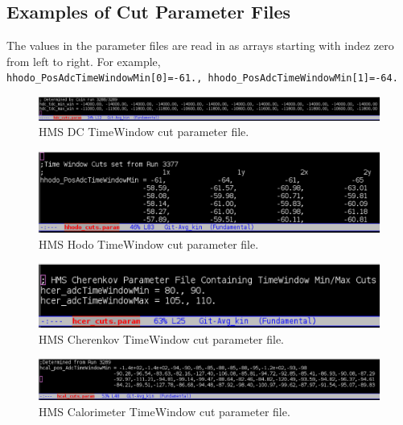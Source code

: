 \documentclass[14pt]{article}
\begin{document}
\newpage 
\begin{appendices}
\appendix
\section{Examples of Cut Parameter Files}
\label{appendix:AppxA}
The values in the parameter files are read in as arrays starting with indez zero from left to right. For example,\\ \texttt{hhodo\_PosAdcTimeWindowMin[0]=-61.,
  hhodo\_PosAdcTimeWindowMin[1]=-64.}
\begin{figure}[H]
  \captionsetup{justification=raggedright,singlelinecheck=false}
  \includegraphics[scale=0.4]{plots/hdc_parm_cut.png}
  \caption{HMS DC TimeWindow cut parameter file.}
  \label{fig:hms_dc_parm_cut}
\end{figure}
\begin{figure}[H]
  \captionsetup{justification=raggedright,singlelinecheck=false}
  \includegraphics[scale=0.4]{plots/hhodo_parm_cut.png}
  \caption{HMS Hodo TimeWindow cut parameter file.}
  \label{fig:hms_hod_parm_cut}
\end{figure}
\begin{figure}[H]
  \captionsetup{justification=raggedright,singlelinecheck=false}
  \includegraphics[scale=0.4]{plots/hcer_parm_cut.png}
  \caption{HMS Cherenkov TimeWindow cut parameter file.}
  \label{fig:hms_cer_parm_cut}
\end{figure}
\begin{figure}[H]
  \captionsetup{justification=raggedright,singlelinecheck=false}
  \includegraphics[scale=0.4]{plots/hcal_parm_cut.png}
  \caption{HMS Calorimeter TimeWindow cut parameter file.}
  \label{fig:hms_cal_parm_cut}
\end{figure}



\end{appendices}
\end{document}
